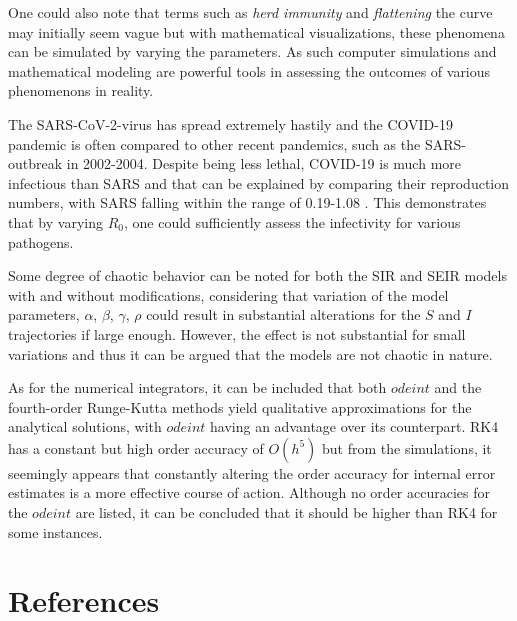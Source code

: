\documentclass[12pt]{article}
\begin{document}
One could also note that terms such as \textit{herd immunity} and \textit{flattening} the curve may initially seem vague but with mathematical visualizations, these phenomena can be simulated by varying the parameters. As such computer simulations and mathematical modeling are powerful tools in assessing the outcomes of various phenomenons in reality. 
  
The SARS-CoV-2-virus has spread extremely hastily and the COVID-19 pandemic is often compared to other recent pandemics, such as the SARS-outbreak in 2002-2004. Despite being less lethal, COVID-19 is much more infectious than SARS and that can be explained by comparing their reproduction numbers, with SARS falling within the range of 0.19-1.08 
\cite{chowell}. This demonstrates that by varying $R_0$, one could sufficiently assess the infectivity for various pathogens.

Some degree of chaotic behavior can be noted for both the SIR and SEIR models with and without modifications, considering that variation of the model parameters, $\alpha$, $\beta$, $\gamma$, $\rho$ could result in substantial alterations for the  $S$ and  $I$ trajectories if large enough. However, the effect is not substantial for small variations and thus it can be argued that the models are not chaotic in nature.

As for the numerical integrators, it can be included that both $odeint$ and the fourth-order Runge-Kutta methods yield qualitative approximations for the analytical solutions, with $odeint$ having an advantage over its counterpart. RK4 has a constant but high order accuracy of $O(h^5)$ but from the simulations, it seemingly appears that constantly altering the order accuracy for internal error estimates is a more effective course of action. Although no order accuracies for the $odeint$ are listed, it can be concluded that it should be higher than RK4 for some instances.
 
\newpage 
\section{References}
\printbibliography[heading=none]
\end{document}
